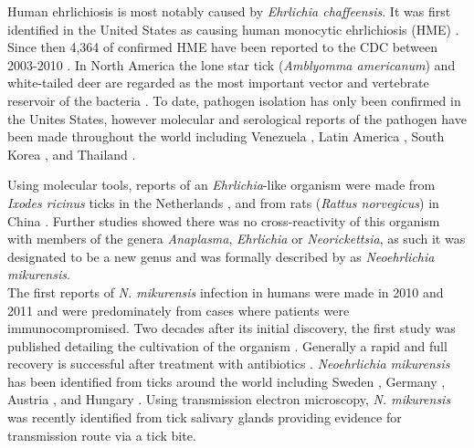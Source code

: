 \documentclass[a4paper, nobind]{templates/ociamthesis}
\begin{document}
Human ehrlichiosis is most notably caused by \emph{Ehrlichia chaffeensis}.
It was first identified in the United States as causing human monocytic ehrlichiosis (HME) \autocite{andersonEhrlichiaChaffeensisNew1991}.
Since then 4,364 of confirmed HME have been reported to the CDC between 2003-2010 \autocite{mmwrFinal2009Reports2010}.
In North America the lone star tick (\emph{Amblyomma americanum}) and white-tailed deer are regarded as the most important vector and vertebrate reservoir of the bacteria \autocite{rarAnaplasmaEhrlichiaCandidatus2011}.
To date, pathogen isolation has only been confirmed in the Unites States, however molecular and serological reports of the pathogen have been made throughout the world including Venezuela \autocite{martinezEhrlichiaChaffeensisChild2008}, Latin America \autocite{gongora-biachiFirstCaseHuman1999,dacostaMoreHumanMonocytotropic2006}, South Korea \autocite{parkDetectionAntibodiesAnaplasma2003}, and Thailand \autocite{heppnerHumanEhrlichiosisThailand1997}.

Using molecular tools, reports of an \emph{Ehrlichia}-like organism were made from \emph{Ixodes ricinus} ticks in the Netherlands \autocite{schoulsDetectionIdentificationEhrlichia1999}, and from rats (\emph{Rattus norvegicus}) in China \autocite{panEhrlichialikeOrganismGene2003}.
Further studies showed there was no cross-reactivity of this organism with members of the genera \emph{Anaplasma}, \emph{Ehrlichia} or \emph{Neorickettsia}, as such it was designated to be a new genus and was formally described by \textcite{kawaharaUltrastructurePhylogeneticAnalysis2004} as \emph{Neoehrlichia mikurensis}.\\
The first reports of \emph{N. mikurensis} infection in humans were made in 2010 and 2011 \autocite{fehrSepticemiaCausedTickborne2010,vonloewenichDetectionCandidatusNeoehrlichia2010,welinder-olssonFirstCaseHuman2010,pekovaCandidatusNeoehrlichiaMikurensis2011} and were predominately from cases where patients were immunocompromised.
Two decades after its initial discovery, the first study was published detailing the cultivation of the organism \autocite{wassCultivationCausativeAgent2019}.
Generally a rapid and full recovery is successful after treatment with antibiotics \autocite{pekovaCandidatusNeoehrlichiaMikurensis2011}.
\emph{Neoehrlichia mikurensis} has been identified from ticks around the world including Sweden \autocite{anderssonCoinfectionCandidatusNeoehrlichia2013}, Germany \autocite{dinizCandidatusNeoehrlichiaMikurensis2011}, Austria \autocite{glatzDetectionCandidatusNeoehrlichia2014}, and Hungary \autocite{hornokMolecularAnalysisIxodes2017}.
Using transmission electron microscopy, \emph{N. mikurensis} was recently identified from tick salivary glands \autocite{ondrusPutativeMorphologyNeoehrlichia2020} providing evidence for transmission route via a tick bite.
\end{document}
